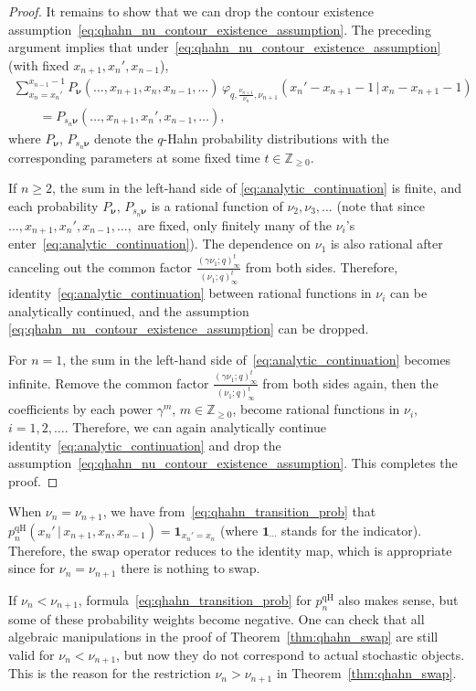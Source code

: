 \begin{proof}
	

	It remains to show that we can drop the contour
	existence assumption~\eqref{eq:qhahn_nu_contour_existence_assumption}.
	The preceding argument implies that
	under~\eqref{eq:qhahn_nu_contour_existence_assumption} (with fixed $x_{n+1},x_n',x_{n-1}$),
	\begin{gather}
		\sum_{x_n=x_n'}^{x_{n-1}-1}
		P_{\boldsymbol\nu}(\ldots,x_{n+1},x_n,x_{n-1},\ldots )\,
		\varphi_{q,\frac{\nu_{n+1}}{\nu_n},\nu_{n+1}}(x_n'-x_{n+1}-1\,|\, x_n-x_{n+1}-1)\nonumber
		\\ \qquad
{}=		P_{s_n\boldsymbol\nu}(\ldots, x_{n+1},x_{n}',x_{n-1},\ldots ),
		\label{eq:analytic_continuation}
	\end{gather}
	where $P_{\boldsymbol\nu}$, $P_{s_n\boldsymbol\nu}$ denote the
	$q$-Hahn probability distributions
	with the corresponding parameters
	at some fixed time $t\in \mathbb{Z}_{\ge0}$.
	
	If $n\ge2$, the sum in the left-hand side of
	\eqref{eq:analytic_continuation}
	is finite, and each probability $P_{\boldsymbol\nu}$,
	$P_{s_n\boldsymbol\nu}$ is a rational function of $\nu_2,\nu_3,\ldots $
	(note that since $\ldots,x_{n+1},x_n',x_{n-1},\ldots, $ are
	fixed, only finitely many of the $\nu_i$'s
	enter~\eqref{eq:analytic_continuation}).
	The dependence on $\nu_1$ is also rational after canceling out the common
	factor $\frac{(\gamma \nu_1;q)_\infty^t}{(\nu_1;q)_\infty^t}$
	from both sides. Therefore, identity~\eqref{eq:analytic_continuation}
	between rational functions in $\nu_i$ can be analytically continued,
	and the assumption
	\eqref{eq:qhahn_nu_contour_existence_assumption} can be dropped.

	For $n=1$, the sum in the left-hand side of~\eqref{eq:analytic_continuation}
	becomes infinite. Remove the
	common factor
	$\frac{(\gamma \nu_1;q)_\infty^t}{(\nu_1;q)_\infty^t}$
	from both sides again,
	then the coefficients by each power
	$\gamma^m$, $m\in \mathbb{Z}_{\ge0}$,
	become rational functions in $\nu_i$, $i=1,2,\ldots $. Therefore,
	we can again analytically continue identity~\eqref{eq:analytic_continuation}
	and drop the assumption~\eqref{eq:qhahn_nu_contour_existence_assumption}.
	This completes the proof.
\end{proof}

\begin{Remark}
	When $\nu_n=\nu_{n+1}$,
	we have from~\eqref{eq:qhahn_transition_prob}
	that $p_n^{\mathrm{qH}}(x_n'\,|\, x_{n+1},x_n,x_{n-1})=\mathbf{1}_{x_n'=x_n}$
	(where $\mathbf{1}_{\cdots}$ stands for the indicator).
	Therefore, the swap operator
	reduces to the identity map, which is appropriate since
	for $\nu_n=\nu_{n+1}$
	there is nothing to swap.

	If $\nu_n<\nu_{n+1}$,
	formula~\eqref{eq:qhahn_transition_prob} for $p_n^{\mathrm{qH}}$ also
	makes sense, but some of these probability weights become negative.
	One can check that
	all algebraic manipulations in the proof of Theorem~\ref{thm:qhahn_swap}
	are still valid for $\nu_n<\nu_{n+1}$,
	but now they do not correspond to actual stochastic objects.
	This is the reason for the restriction $\nu_n>\nu_{n+1}$ in
	Theorem~\ref{thm:qhahn_swap}.
\end{Remark}
